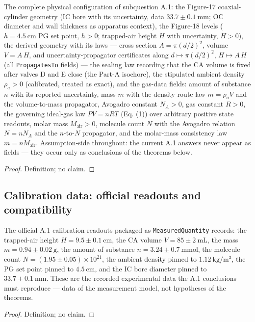 \begin{definition}
\label{def:IPhO2026Problems_problem_IPhO_2026_4_A_1:ConfinedAirColumn}
The complete physical configuration of subquestion A.1: the
Figure-17 coaxial-cylinder geometry (IC bore with its uncertainty,
data $33.7 \pm 0.1\ \mathrm{mm}$; OC diameter and wall thickness as
apparatus context), the Figure-18 levels ($h = 4.5\ \mathrm{cm}$ PG
set point, $h > 0$; trapped-air height $H$ with uncertainty,
$H > 0$), the derived geometry with its laws --- cross section
$A = \pi (d/2)^2$, volume $V = A\,H$, and uncertainty-propagator
certificates along $d \mapsto \pi(d/2)^2$, $H \mapsto A\,H$ (all
\texttt{PropagatesTo} fields) --- the sealing law recording that the
CA volume is fixed after valves D and E close (the Part-A isochore),
the stipulated ambient density $\rho_a > 0$ (calibrated, treated as
exact), and the gas-data fields: amount of substance $n$ with its
reported uncertainty, mass $m$ with the density-route law
$m = \rho_a V$ and the volume-to-mass propagator, Avogadro constant
$N_A > 0$, gas constant $R > 0$, the governing ideal-gas law
$P V = n R T$ (Eq. (1)) over arbitrary positive state readouts,
molar mass $M_{\mathrm{air}} > 0$, molecule count $N$ with the
Avogadro relation $N = n N_A$ and the $n$-to-$N$ propagator, and the
molar-mass consistency law $m = n M_{\mathrm{air}}$.  Assumption-side
throughout: the current A.1 answers never appear as fields --- they
occur only as conclusions of the theorems below.
\end{definition}
\begin{proof}
Definition; no claim.
\end{proof}

\subsection*{Calibration data: official readouts and compatibility}

\begin{definition}
\label{def:IPhO2026Problems_problem_IPhO_2026_4_A_1:OfficialReadouts}
The official A.1 calibration readouts packaged as
\texttt{MeasuredQuantity} records: the trapped-air height
$H = 9.5 \pm 0.1\ \mathrm{cm}$, the CA volume
$V = 85 \pm 2\ \mathrm{mL}$, the mass $m = 0.94 \pm 0.02\ \mathrm{g}$,
the amount of substance $n = 3.24 \pm 0.7\ \mathrm{mmol}$, the
molecule count $N = (1.95 \pm 0.05)\times 10^{21}$, the ambient
density pinned to $1.12\ \mathrm{kg/m^3}$, the PG set point pinned to
$4.5\ \mathrm{cm}$, and the IC bore diameter pinned to
$33.7 \pm 0.1\ \mathrm{mm}$.  These are the recorded experimental
data the A.1 conclusions must reproduce --- data of the measurement
model, not hypotheses of the theorems.
\end{definition}
\begin{proof}
Definition; no claim.
\end{proof}

